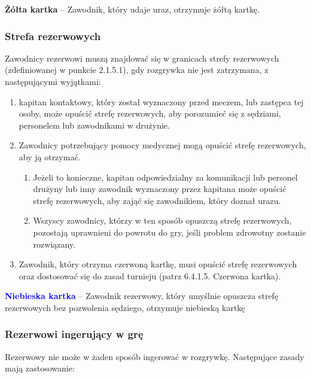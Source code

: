 \documentclass[12pt]{article}
\newcommand\yellowcard[1]{\bgroup\textcolor{darkyellow}{\textbf{#1}}}
\newcommand\bluecard[1]{\bgroup\textcolor{blue}{\textbf{#1}}}
\begin{document}
\yellowcard{Żółta kartka} -- Zawodnik, który udaje uraz, otrzymuje żółtą
kartkę.

\subsubsection{Strefa rezerwowych}

Zawodnicy rezerwowi muszą znajdować się w granicach strefy rezerwowych
(zdefiniowanej w punkcie 2.1.5.1), gdy rozgrywka nie jest zatrzymana, z
następującymi wyjątkami:

\begin{enumerate}
	\item
	      kapitan kontaktowy, który został wyznaczony przed meczem, lub zastępca
	      tej osoby, może opuścić strefę rezerwowych, aby porozumieć się z
	      sędziami, personelem lub zawodnikami w drużynie.
	\item
	      Zawodnicy potrzebujący pomocy medycznej mogą opuścić strefę
	      rezerwowych, aby ją otrzymać.

	      \begin{enumerate}
		      \item
		            Jeżeli to konieczne, kapitan odpowiedzialny za komunikacji lub
		            personel drużyny lub inny zawodnik wyznaczony przez kapitana może
		            opuścić strefę rezerwowych, aby zająć się zawodnikiem, który doznał
		            urazu.
		      \item
		            Wszyscy zawodnicy, którzy w ten sposób opuszczą strefę rezerwowych,
		            pozostają uprawnieni do powrotu do gry, jeśli problem zdrowotny
		            zostanie rozwiązany.
	      \end{enumerate}
	\item
	      Zawodnik, który otrzyma czerwoną kartkę, musi opuścić strefę
	      rezerwowych oraz dostosować się do zasad turnieju (patrz 6.4.1.5.
	      Czerwona kartka).
\end{enumerate}

\bluecard{Niebieska kartka} -- Zawodnik rezerwowy, który umyślnie opuszcza
strefę rezerwowych bez pozwolenia sędziego, otrzymuje niebieską kartkę

\subsubsection{Rezerwowi ingerujący w grę}

Rezerwowy nie może w żaden sposób ingerować w rozgrywkę. Następujące
zasady mają zastosowanie:
\end{document}
